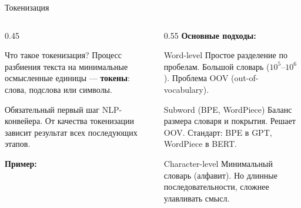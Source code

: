 \documentclass[aspectratio=169, 9pt]{beamer}
\begin{document}
\begin{frame}{Токенизация}
  \begin{columns}[T]
    \begin{column}{0.45\textwidth}
      \begin{block}{Что такое токенизация?}
        Процесс разбиения текста на минимальные осмысленные единицы — \textbf{токены}: слова, подслова или символы.
      \end{block}
      
      \vspace{0.3em}
      Обязательный первый шаг NLP-конвейера. От качества токенизации зависит результат всех последующих этапов.
      
      \vspace{0.3em}
      \textbf{Пример:}
      \begin{center}
      \end{center}
    \end{column}
    \begin{column}{0.55\textwidth}
      \textbf{Основные подходы:}
      
      \begin{block}{Word-level}
        Простое разделение по пробелам. Большой словарь ($10^5$--$10^6$). Проблема OOV (out-of-vocabulary).
      \end{block}
      
      \begin{block}{Subword (BPE, WordPiece)}
        Баланс размера словаря и покрытия. Решает OOV. Стандарт: BPE в GPT, WordPiece в BERT.
      \end{block}
      
      \begin{block}{Character-level}
        Минимальный словарь (алфавит). Но длинные последовательности, сложнее улавливать смысл.
      \end{block}
    \end{column}
  \end{columns}
\end{frame}
\end{document}
